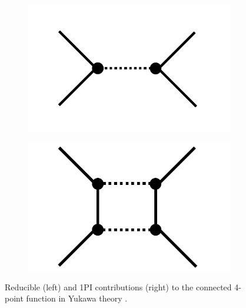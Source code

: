 \begin{figure}[t]
\centering
\hfill
\begin{subfigure}{0.4\textwidth}
\includegraphics[scale=0.55, valign=c]{figs/diagrams/correlations/connected_02} 
\end{subfigure}
\hfill
\begin{subfigure}{0.4\textwidth}
\includegraphics[scale=0.55, valign=c]{figs/diagrams/correlations/1PI} 
\end{subfigure}
\hfill

\caption[Reducible and 1PI contribution to the connected 4-point function in Yukawa theory.]{Reducible (left) and 1PI contributions (right) to the connected 4-point function in Yukawa theory \cite{QFTNotesFloerchingerWetterich}.}
\label{fig:1PI_correlators}
\end{figure}


